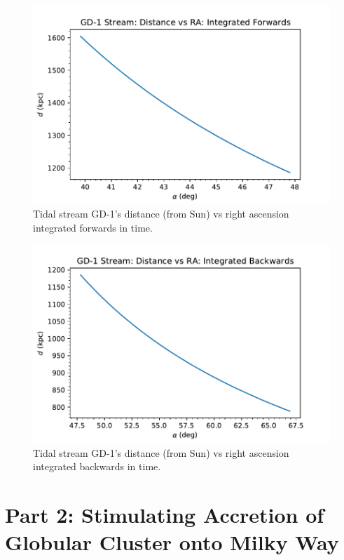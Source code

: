 \documentclass[apj]{emulateapj}
\begin{document}
\begin{figure}
    \centering
    \includegraphics[width=1.0\columnwidth]{Q1c_2.pdf}
    \caption{Tidal stream GD-1's distance (from Sun) vs right ascension integrated forwards in time.}
    \label{fig:Q1_radist_f}
\end{figure}

\begin{figure}
    \centering
    \includegraphics[width=1.0\columnwidth]{Q1c_4.pdf}
    \caption{Tidal stream GD-1's distance (from Sun) vs right ascension integrated backwards in time.}
    \label{fig:Q1_radist_b}
\end{figure}


\section{Part 2: Stimulating Accretion of Globular Cluster onto Milky Way}
\end{document}
